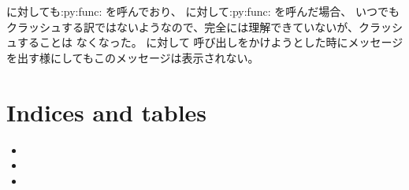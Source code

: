 \documentclass[a4paper,12pt,dvipdfmx]{sphinxhowto}
\begin{document}
\sphinxAtStartPar
{} に対しても:py:func: を呼んでおり、 に対して:py:func: を呼んだ場合、
いつでもクラッシュする訳ではないようなので、完全には理解できていないが、クラッシュすることは
なくなった。  に対して  呼び出しをかけようとした時にメッセージを出す様にしてもこのメッセージは表示されない。


\section{Indices and tables}
\label{\detokenize{index:indices-and-tables}}\begin{itemize}
\item {} 
\sphinxAtStartPar
{}

\item {} 
\sphinxAtStartPar
{}

\item {} 
\sphinxAtStartPar
{}

\end{itemize}



\renewcommand{\indexname}{索引}
\printindex
\end{document}
